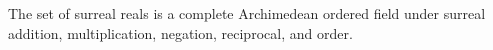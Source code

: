 
\begin{theorem}\label{style_surreal_real_field}
    The set of surreal reals is a complete Archimedean ordered field under
    surreal addition, multiplication, negation, reciprocal, and order.
\end{theorem}
